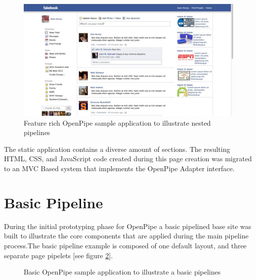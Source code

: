 \documentclass[12pt]{report}
\begin{document}
\begin{figure}[H]
\label{fig:sampleApp}
\centering
\includegraphics[width=\textwidth,keepaspectratio]{figures/images/sample_app.jpg}
\caption{Feature rich OpenPipe sample application to illustrate nested pipelines}
\end{figure}

The static application contains a diverse amount of sections. The resulting HTML, CSS, and JavaScript code created during this page creation was migrated to an MVC Based system that implements the OpenPipe Adapter interface.


\section{Basic Pipeline}

During the initial prototyping phase for OpenPipe a basic pipelined base site was built to illustrate the core components that are applied during the main pipeline process.The basic pipeline example is composed of one default layout, and three separate page pipelets [see figure \ref{fig:basicPipeline}]. 

\begin{figure}[H]
\label{fig:basicPipeline}
\centering
{}
\caption{Basic OpenPipe sample application to illustrate a basic pipelines}
\end{figure}
\end{document}
